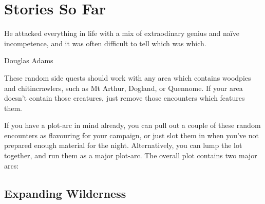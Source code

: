 \chapter{Stories So Far}
	\epigraph{He attacked everything in life with a mix of extraodinary genius and na\"ive incompetence, and it was often difficult to tell which was which.}{Douglas Adams}

\begin{multicols}{2}

These random side quests should work with any area which contains woodpies and chitincrawlers, such as Mt Arthur, Dogland, or Quennome.
If your area doesn't contain those creatures, just remove those encounters which features them.

If you have a plot-arc in mind already, you can pull out a couple of these random encounters as flavouring for your campaign, or just slot them in when you've not prepared enough material for the night.  Alternatively, you can lump the lot together, and run them as a major plot-arc.  The overall plot contains two major arcs:

\end{multicols}

\section{Expanding Wilderness}

